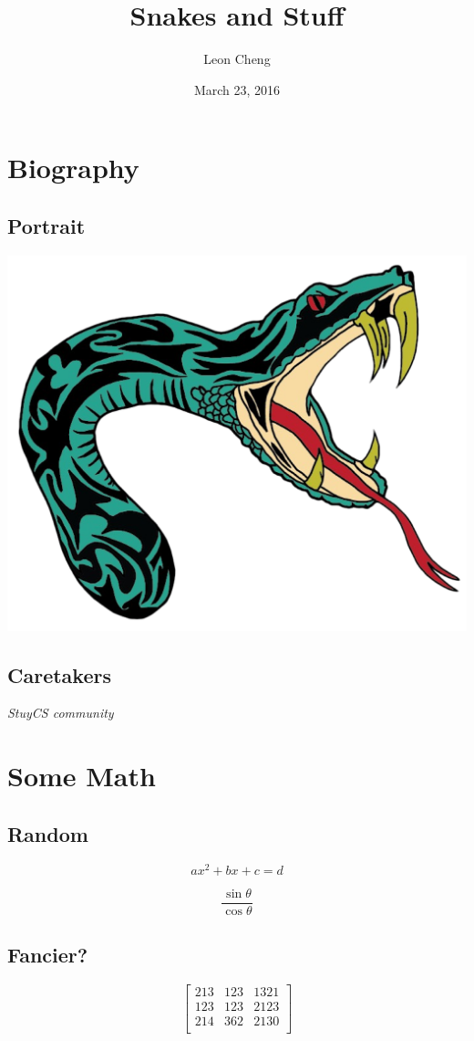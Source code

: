 \documentclass{article}
\title{Snakes and Stuff}
\author{Leon Cheng}
\date{March 23, 2016}
\begin{document}
\maketitle



\section{Biography}

\subsection{Portrait}

\includegraphics[scale=0.3]{thluffy.png}

\subsection{Caretakers}
\textit{StuyCS community}

\section{Some Math}

\subsection{Random}
$$ ax^2+bx+c=d $$

$$ \frac{\sin \theta }{\cos \theta} $$

\subsection{Fancier?}
$$
\begin{bmatrix}
213 & 123 & 1321 \\
123 & 123 & 2123 \\
214 & 362 & 2130 \\
\end{bmatrix}
$$
\end{document}
